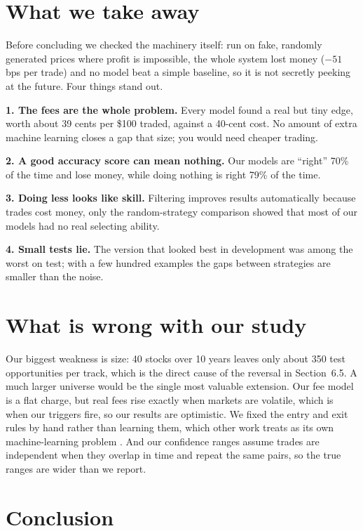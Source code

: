 \documentclass[10pt]{article}
\begin{document}
\section{What we take away}

Before concluding we checked the machinery itself: run on fake, randomly
generated prices where profit is impossible, the whole system lost money ($-51$
bps per trade) and no model beat a simple baseline, so it is not secretly
peeking at the future. Four things stand out.

\textbf{1. The fees are the whole problem.} Every model found a real but tiny
edge, worth about 39 cents per \$100 traded, against a 40-cent cost. No amount of
extra machine learning closes a gap that size; you would need cheaper trading.

\textbf{2. A good accuracy score can mean nothing.} Our models are ``right'' 70\%
of the time and lose money, while doing nothing is right 79\% of the time.

\textbf{3. Doing less looks like skill.} Filtering improves results automatically
because trades cost money, only the random-strategy comparison showed that
most of our models had no real selecting ability.

\textbf{4. Small tests lie.} The version that looked best in development was
among the worst on test; with a few hundred examples the gaps between strategies
are smaller than the noise.

\section{What is wrong with our study}

Our biggest weakness is size: 40 stocks over 10 years leaves only about 350 test
opportunities per track, which is the direct cause of the reversal in
Section~6.5. A much larger universe would be the single most valuable extension.
Our fee model is a flat charge, but real fees rise exactly when markets are
volatile,  which is when our triggers fire, so our results are
optimistic. We fixed the entry and exit rules by hand rather than learning them,
which other work treats as its own machine-learning problem \cite{ekinci2025}.
And our confidence ranges assume trades are independent when they overlap in time
and repeat the same pairs, so the true ranges are wider than we report.

\section{Conclusion}
\end{document}
